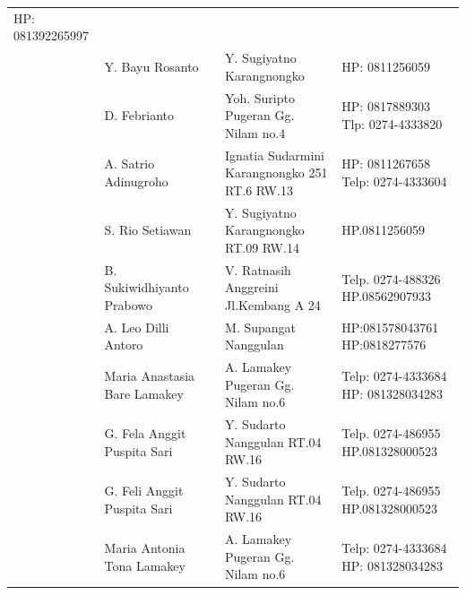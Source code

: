 \documentclass{article}
\begin{document}
\begin{flushleft}
\begin{supertabular}{m{0.7cm}m{4.0090003cm}m{1.3149999cm}m{4.118cm}m{0.17599998cm}}
HP: 081392265997\\
 &
Y. Bayu Rosanto &
 &
Y. Sugiyatno  Karangnongko   &
HP: 0811256059\\
 &
D. Febrianto &
 &
Yoh. Suripto  Pugeran Gg. Nilam no.4   &
HP: 0817889303  Tlp: 0274-4333820\\
 &
A. Satrio Adinugroho &
 &
Ignatia Sudarmini  Karangnongko 251 RT.6 RW.13   &
HP: 0811267658  Telp: 0274-4333604\\
 &
S. Rio Setiawan &
 &
Y. Sugiyatno  Karangnongko RT.09 RW.14  &
HP.0811256059\\
 &
B. Sukiwidhiyanto Prabowo &
 &
V. Ratnasih Anggreini Jl.Kembang A 24   &
Telp. 0274-488326 HP.08562907933\\
 &
A. Leo Dilli Antoro &
 &
M. Supangat  Nanggulan &
HP:081578043761 HP:0818277576\\
 &
Maria Anastasia Bare Lamakey &
 &
A. Lamakey  Pugeran Gg. Nilam no.6  &
Telp: 0274-4333684  HP: 081328034283\\
 &
G. Fela Anggit Puspita Sari &
 &
Y. Sudarto  Nanggulan RT.04 RW.16 &
Telp. 0274-486955 HP.081328000523\\
 &
G. Feli Anggit Puspita Sari &
 &
Y. Sudarto  Nanggulan RT.04 RW.16 &
Telp. 0274-486955 HP.081328000523\\
 &
Maria Antonia Tona Lamakey &
 &
A. Lamakey  Pugeran Gg. Nilam no.6  &
Telp: 0274-4333684  HP: 081328034283\\
\end{supertabular}
\end{flushleft}
\end{document}
